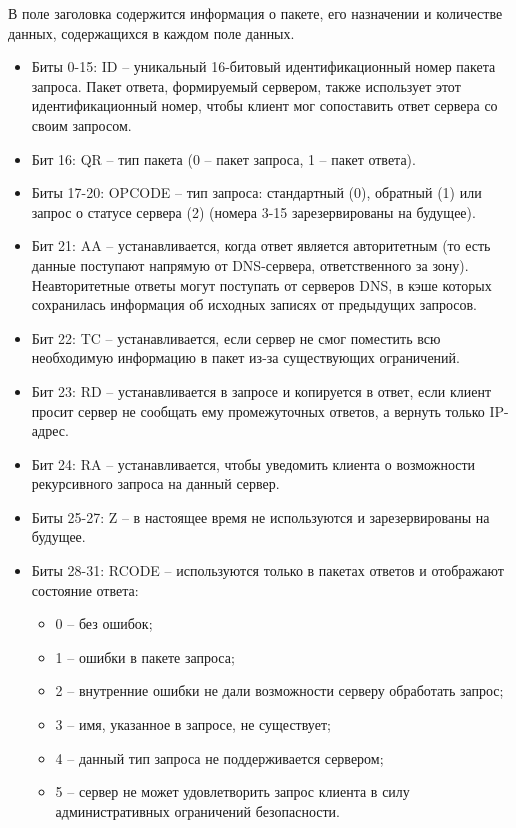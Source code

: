 В поле заголовка содержится информация о пакете, его назначении и количестве данных, содержащихся в каждом поле данных.

\begin{itemize}
	\item Биты 0-15: ID -- уникальный 16-битовый идентификационный номер пакета запроса. Пакет ответа, формируемый сервером, также использует этот идентификационный номер, чтобы клиент мог сопоставить ответ сервера со своим запросом.
	\item Бит 16: QR -- тип пакета (0 -- пакет запроса, 1 -- пакет ответа). 
	\item Биты 17-20: OPCODE -- тип запроса: стандартный (0), обратный (1) или запрос о статусе сервера (2) (номера 3-15 зарезервированы на будущее).
	\item Бит 21: AA -- устанавливается, когда ответ является авторитетным (то есть данные поступают напрямую от DNS-сервера, ответственного за зону). Неавторитетные ответы могут поступать от серверов DNS, в кэше которых сохранилась информация об исходных записях от предыдущих запросов.
	\item Бит 22: TC -- устанавливается, если сервер не смог поместить всю необходимую информацию в пакет из-за существующих ограничений.
	\item Бит 23: RD -- устанавливается в запросе и копируется в ответ, если клиент просит сервер не сообщать ему промежуточных ответов, а вернуть только IP-адрес.
	\item Бит 24: RA -- устанавливается, чтобы уведомить клиента о возможности рекурсивного запроса на данный сервер.
	\item Биты 25-27: Z -- в настоящее время не используются и зарезервированы на будущее.
	\item Биты 28-31: RCODE -- используются только в пакетах ответов и отображают состояние ответа: 
	\begin{itemize}
		\item 0 -- без ошибок;
		\item 1 -- ошибки в пакете запроса;
		\item 2 -- внутренние ошибки не дали возможности серверу обработать запрос;
		\item 3 -- имя, указанное в запросе, не существует;
		\item 4 -- данный тип запроса не поддерживается сервером;
		\item 5 --  сервер не может удовлетворить запрос клиента в силу административных ограничений безопасности.
	\end{itemize}
\end{itemize}


